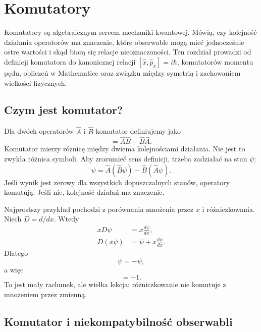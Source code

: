 \chapter{Komutatory}

\begin{summarybox}
Komutatory są algebraicznym sercem mechaniki kwantowej. Mówią, czy kolejność
działania operatorów ma znaczenie, które obserwable mogą mieć jednocześnie ostre
wartości i skąd biorą się relacje nieoznaczoności. Ten rozdział prowadzi od
definicji komutatora do kanonicznej relacji \([\hat{x},\hat{p}_x]=i\hbar\),
komutatorów momentu pędu, obliczeń w Mathematice oraz związku między symetrią i
zachowaniem wielkości fizycznych.
\end{summarybox}

\section{Czym jest komutator?}

Dla dwóch operatorów \(\hat{A}\) i \(\hat{B}\) komutator definiujemy jako
\begin{equation}
    [\hat{A},\hat{B}]=\hat{A}\hat{B}-\hat{B}\hat{A}.
\end{equation}
Komutator mierzy różnicę między dwiema kolejnościami działania. Nie jest to zwykła różnica symboli. Aby zrozumieć sens definicji, trzeba zadziałać na stan \(\psi\):
\begin{equation}
    [\hat{A},\hat{B}]\psi
    =\hat{A}(\hat{B}\psi)-\hat{B}(\hat{A}\psi).
\end{equation}
Jeśli wynik jest zerowy dla wszystkich dopuszczalnych stanów, operatory komutują. Jeśli nie, kolejność działań ma znaczenie.

Najprostszy przykład pochodzi z porównania mnożenia przez \(x\) i różniczkowania. Niech \(D=d/dx\). Wtedy
\begin{align}
    xD\psi &= x\frac{d\psi}{dx},\\
    D(x\psi)&=\psi+x\frac{d\psi}{dx}.
\end{align}
Dlatego
\begin{equation}
    [x,D]\psi=-\psi,
\end{equation}
a więc
\begin{equation}
    [x,D]=-1.
\end{equation}
To jest mały rachunek, ale wielka lekcja: różniczkowanie nie komutuje z mnożeniem przez zmienną.

\section[Komutator i niekompatybilność obserwabli]{Komutator i niekompatybilność obserwabli}

